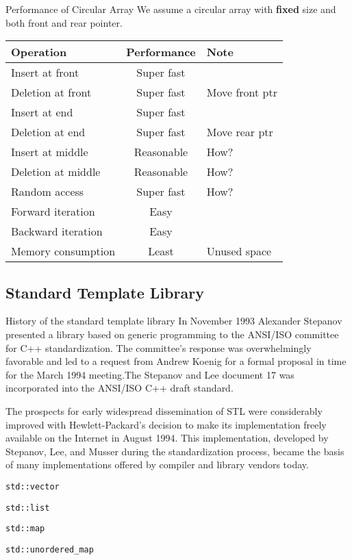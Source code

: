 \begin{frame}{Performance of Circular Array}
We assume a circular array with \textbf{fixed} size and both front and rear pointer. 

\vspace{-.1in}
\begin{table}
	\begin{tabular}{l | c | l }
		Operation & Performance & Note \\
		\hline \hline
		Insert at front & Super fast  & \\ 
		Deletion at front & Super fast & Move front ptr\\
		Insert at end & Super fast & \\
		Deletion at end & Super fast & Move rear ptr\\
		Insert at middle & Reasonable & How?\\
		Deletion at middle & Reasonable & How?\\
		Random access & Super fast & How?\\
		Forward iteration & Easy & \\
		Backward iteration & Easy & \\
		Memory consumption & Least & Unused space \\
	\end{tabular}
\end{table}
\end{frame}

\subsection{Standard Template Library}
\begin{frame}{History of the standard template library}
In November 1993 Alexander Stepanov presented a library based on generic programming to the ANSI/ISO committee for C++ standardization. The committee's response was overwhelmingly favorable and led to a request from Andrew Koenig for a formal proposal in time for the March 1994 meeting.The Stepanov and Lee document 17 was incorporated into the ANSI/ISO C++ draft standard.

The prospects for early widespread dissemination of STL were considerably improved with Hewlett-Packard's decision to make its implementation freely available on the Internet in August 1994. This implementation, developed by Stepanov, Lee, and Musser during the standardization process, became the basis of many implementations offered by compiler and library vendors today.
\end{frame}

\begin{frame}{\texttt{std::vector}}

\end{frame}

\begin{frame}{\texttt{std::list}}

\end{frame}

\begin{frame}{\texttt{std::map}}

\end{frame}

\begin{frame}{\texttt{std::unordered\_map}}

\end{frame}
